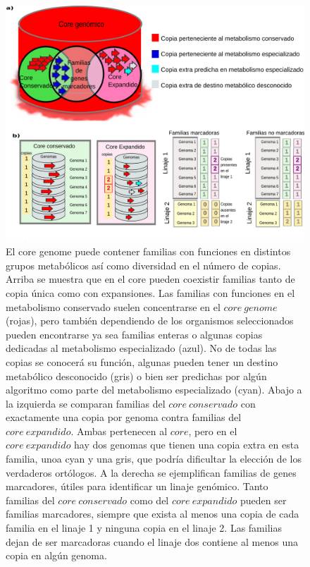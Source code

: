 \documentclass[12pt,twoside]{reedthesis}
\begin{document}
  \begin{figure}[h!tbp]
  \centering
  \includegraphics[angle = 0,scale = .8]{chapter1/CoreMarcadores.png}
  \caption[Core y genes Marcadores]{\footnotesize{El core genome puede contener familias con funciones en distintos grupos metabólicos así como diversidad en el número de copias. Arriba se muestra que en el core pueden coexistir familias tanto de copia única como con expansiones. Las familias con funciones en el metabolismo conservado suelen concentrarse en el $core~genome$ (rojas), pero también dependiendo de los organismos seleccionados pueden encontrarse ya sea familias enteras o algunas copias dedicadas al metabolismo especializado (azul). No de todas las copias se conocerá su función, algunas pueden tener un destino metabólico desconocido (gris) o bien ser predichas por algún algoritmo como parte del metabolismo especializado (cyan).  Abajo a la izquierda se comparan familias del $core~conservado$ con exactamente una copia por genoma contra familias del $core~expandido$. Ambas pertenecen al $core$, pero en el $core~expandido$ hay dos genomas que tienen una copia extra en esta familia, unoa cyan y una gris, que podría dificultar la elección de los verdaderos ortólogos. A la derecha se ejemplifican familias de genes marcadores, útiles para identificar un linaje genómico. Tanto familias del $core~conservado$ como del $core~expandido$ pueden ser familias marcadores, siempre que exista al menos una copia de cada familia en el linaje 1 y ninguna copia en el linaje 2. Las familias dejan de ser marcadoras cuando el linaje dos contiene al menos una copia en algún genoma.}}
  \label{fig:CoreMarcadores}
  \end{figure}
  
\end{document}

